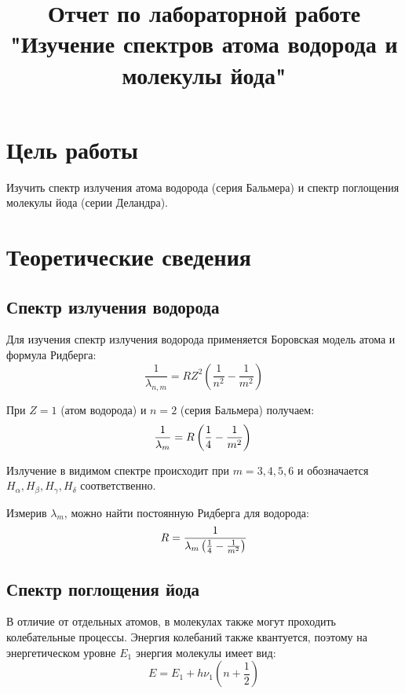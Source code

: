 \documentclass[12pt]{article}
\begin{document}
\title{Отчет по лабораторной работе "Изучение спектров атома водорода и молекулы йода"}
\maketitle
\newpage

\tableofcontents
\newpage

\section{Цель работы}
Изучить спектр излучения атома водорода (серия Бальмера) и спектр поглощения молекулы йода (серии Деландра).

\section{Теоретические сведения}
\subsection{Спектр излучения водорода}
Для изучения спектр излучения водорода применяется Боровская модель атома
и формула Ридберга:
\begin{equation*}
    \frac{1}{\lambda_{n,m}} = R Z^2 \left( \frac{1}{n^2} - \frac{1}{m^2} \right)
\end{equation*}

При $Z = 1$ (атом водорода) и $n = 2$ (серия Бальмера) получаем:
\begin{equation*}
    \frac{1}{\lambda_m} = R \left( \frac{1}{4} - \frac{1}{m^2} \right) \\
\end{equation*}

Излучение в видимом спектре происходит при
$m = 3, 4, 5, 6$ и обозначается $H_\alpha, H_\beta, H_\gamma, H_\delta$ соответственно.


Измерив $\lambda_m$, можно найти постоянную Ридберга для водорода:
\begin{equation*}
    R = \frac{1}{\lambda_m \left( \frac{1}{4} - \frac{1}{m^2} \right)} \\
\end{equation*}

\subsection{Спектр поглощения йода}
В отличие от отдельных атомов, в молекулах также могут проходить колебательные процессы.
Энергия колебаний также квантуется, поэтому на энергетическом уровне $E_1$
энергия молекулы имеет вид:
\begin{equation*}
    E = E_1 + h \nu_1 (n + \frac{1}{2})
\end{equation*}
\end{document}
